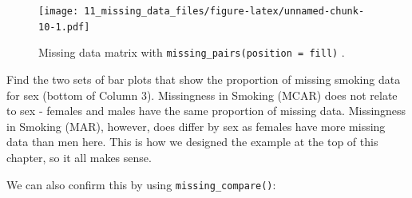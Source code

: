 \documentclass[
  12pt,
  krantz2]{krantz}
\makeatletter
\newenvironment{Shaded}{\begin{snugshade}}{\end{snugshade}}
\newcommand{\KeywordTok}[1]{\textcolor[rgb]{0.13,0.29,0.53}{\textbf{#1}}}
\newcommand{\NormalTok}[1]{#1}
\newcommand{\OperatorTok}[1]{\textcolor[rgb]{0.81,0.36,0.00}{\textbf{#1}}}
\newcommand{\StringTok}[1]{\textcolor[rgb]{0.31,0.60,0.02}{#1}}
\newenvironment{kframe}{%
\medskip{}
\setlength{\fboxsep}{.8em}
 \def\at@end@of@kframe{}%
 \ifinner\ifhmode%
  \def\at@end@of@kframe{\end{minipage}}%
  \begin{minipage}{\columnwidth}%
 \fi\fi%
 \def\FrameCommand##1{\hskip\@totalleftmargin \hskip-\fboxsep
 \colorbox{shadecolor}{##1}\hskip-\fboxsep
     \hskip-\linewidth \hskip-\@totalleftmargin \hskip\columnwidth}%
 \MakeFramed {\advance\hsize-\width
   \@totalleftmargin\z@ \linewidth\hsize
   \@setminipage}}%
 {\par\unskip\endMakeFramed%
 \at@end@of@kframe}
\renewenvironment{Shaded}{\begin{kframe}}{\end{kframe}}
\makeatother
\begin{document}
\begin{figure}
\centering
\texttt{[image: 11\_missing\_data\_files/figure-latex/unnamed-chunk-10-1.pdf]}
\caption{\label{fig:unnamed-chunk-10}Missing data matrix with \texttt{missing\_pairs(position\ =\ \textquotesingle{}fill\textquotesingle{})} .}
\end{figure}

Find the two sets of bar plots that show the proportion of missing smoking data for sex (bottom of Column 3).
Missingness in Smoking (MCAR) does not relate to sex - females and males have the same proportion of missing data.
Missingness in Smoking (MAR), however, does differ by sex as females have more missing data than men here.
This is how we designed the example at the top of this chapter, so it all makes sense.

We can also confirm this by using \texttt{missing\_compare()}:

\begin{Shaded}
\end{Shaded}

\begin{table}[!h]

\caption{\label{tab:unnamed-chunk-12}Missing data comparison: Smoking (MCAR).}
\centering
{}
\end{table}
\end{document}
